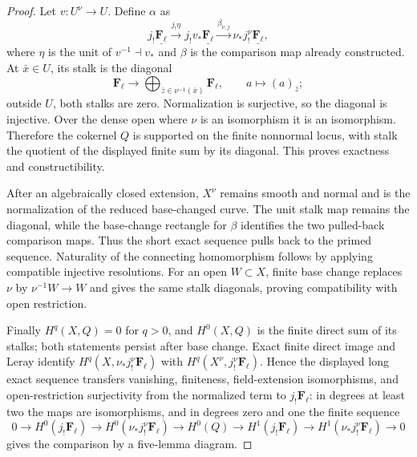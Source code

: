 \begin{proof}

Let $v:U^\nu\to U$.  Define $\alpha$ as
\[
 j_!\underline{\mathbf F_\ell}
 \xrightarrow{j_!\eta}
 j_!v_*\underline{\mathbf F_\ell}
 \xrightarrow{\beta_{\nu,j}}
 \nu_*j^\nu_!\underline{\mathbf F_\ell},
\]
where $\eta$ is the unit of $v^{-1}\dashv v_*$ and $\beta$ is the comparison
map already constructed.  At $\bar x\in U$, its stalk is the diagonal
\[
 \mathbf F_\ell\longrightarrow
 \bigoplus_{\bar z\in\nu^{-1}(\bar x)}\mathbf F_\ell,\qquad
 a\longmapsto(a)_{\bar z};
\]
outside $U$, both stalks are zero.  Normalization is surjective, so the
diagonal is injective.  Over the dense open where $\nu$ is an isomorphism it
is an isomorphism.  Therefore the cokernel $Q$ is supported on the finite
nonnormal locus, with stalk the quotient of the displayed finite sum by its
diagonal.  This proves exactness and constructibility.

After an algebraically closed extension, $X^\nu$ remains smooth and normal
and is the normalization of the reduced base-changed curve.  The unit stalk
map remains the diagonal, while the base-change rectangle for $\beta$
identifies the two pulled-back comparison maps.  Thus the short exact
sequence pulls back to the primed sequence.  Naturality of the connecting
homomorphism follows by applying compatible injective resolutions.  For an
open $W\subset X$, finite base change replaces $\nu$ by
$\nu^{-1}W\to W$ and gives the same stalk diagonals, proving compatibility
with open restriction.

Finally $H^q(X,Q)=0$ for $q>0$, and
$H^0(X,Q)$ is the finite direct sum of its stalks; both statements persist
after base change.  Exact finite direct image and Leray identify
$H^q(X,\nu_*j^\nu_!\mathbf F_\ell)$ with
$H^q(X^\nu,j^\nu_!\mathbf F_\ell)$.  Hence the displayed long exact
sequence transfers vanishing, finiteness, field-extension isomorphisms, and
open-restriction surjectivity from the normalized term to
$j_!\mathbf F_\ell$: in degrees at least two the maps are isomorphisms, and
in degrees zero and one the finite sequence
\[
0\to H^0(j_!\mathbf F_\ell)\to H^0(\nu_*j^\nu_!\mathbf F_\ell)
\to H^0(Q)\to H^1(j_!\mathbf F_\ell)\to
H^1(\nu_*j^\nu_!\mathbf F_\ell)\to0
\]
gives the comparison by a five-lemma diagram.
\end{proof}

